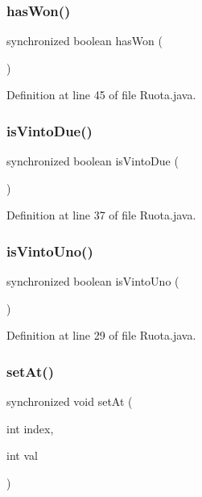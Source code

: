 \subsubsection{\texorpdfstring{has\+Won()}{hasWon()}}
{\footnotesize\ttfamily synchronized boolean has\+Won (\begin{DoxyParamCaption}{ }\end{DoxyParamCaption})}



Definition at line 45 of file Ruota.\+java.

\mbox{\label{classmain_1_1_ruota_afd35315bdd4e0c12efd6d410f9573784}} 
\subsubsection{\texorpdfstring{is\+Vinto\+Due()}{isVintoDue()}}
{\footnotesize\ttfamily synchronized boolean is\+Vinto\+Due (\begin{DoxyParamCaption}{ }\end{DoxyParamCaption})}



Definition at line 37 of file Ruota.\+java.

\mbox{\label{classmain_1_1_ruota_ae2a86522fbeb35b9286bf2a14f663186}} 
\subsubsection{\texorpdfstring{is\+Vinto\+Uno()}{isVintoUno()}}
{\footnotesize\ttfamily synchronized boolean is\+Vinto\+Uno (\begin{DoxyParamCaption}{ }\end{DoxyParamCaption})}



Definition at line 29 of file Ruota.\+java.

\mbox{\label{classmain_1_1_ruota_a3debdaf5d71e61062f8c3ac4bfba02b8}} 
\subsubsection{\texorpdfstring{set\+At()}{setAt()}}
{\footnotesize\ttfamily synchronized void set\+At (\begin{DoxyParamCaption}\item[{int}]{index,  }\item[{int}]{val }\end{DoxyParamCaption})}



